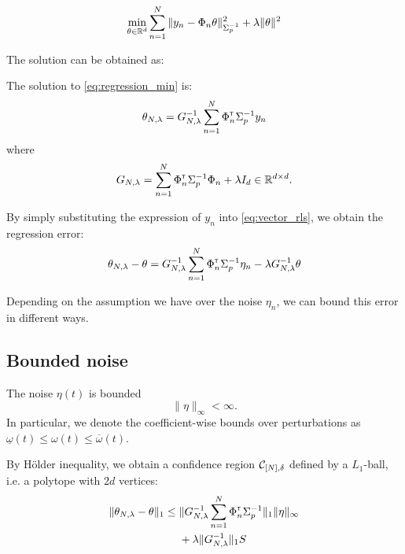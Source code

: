 \documentclass{article}
\begin{document}
\begin{equation}
    \label{eq:regression_min}
    \min_{\theta\in\mathbb{R}^d} \sum_{n=1}^N \|y_n -\Phi_n\theta\|_{\Sigma_p^{-1}}^2 + \lambda\|\theta\|_{}^2
\end{equation}


The solution can be obtained as:

\begin{proposition}
\label{prop:regularized_solution}
The solution to \eqref{eq:regression_min} is:
\begin{equation}
    \label{eq:vector_rls}
    \theta_{N,\lambda} = G_{N, \lambda}^{-1} \sum_{n=1}^N \Phi_n^{\mathsf{\scriptscriptstyle T}} \Sigma_p^{-1} y_n
\end{equation}
where 
\begin{equation}
\label{eq:g_n_lambda}
    G_{N, \lambda} = \sum_{n=1}^N \Phi_{n}^{\mathsf{\scriptscriptstyle T}}\Sigma_p^{-1}\Phi_{n}  + \lambda I_d \in \mathbb{R}^{d\times d}.
\end{equation}
\end{proposition}

By simply substituting the expression of $y_n$ into \eqref{eq:vector_rls}, we obtain the regression error:
\begin{align}
    \theta_{N,\lambda} - \theta = G_{N, \lambda}^{-1}\sum_{n=1}^N \Phi_n^{\mathsf{\scriptscriptstyle T}} \Sigma_p^{-1}\eta_n - \lambda G_{N, \lambda}^{-1}\theta 
\end{align}


Depending on the assumption we have over the noise $\eta_n$, we can bound this error in different ways.


\subsection{Bounded noise}

\begin{assumption}
\label{assumpt:bounded-noise}
The noise $\eta(t)$ is bounded
\[
\|\eta\|_\infty < \infty.
\]
In particular, we denote the coefficient-wise bounds over perturbations as $\underline{\omega}(t) \leq \omega(t) \leq \overline{\omega}(t)$.
\end{assumption}

By Hölder inequality, we obtain a confidence region $\mathcal{C}_{[N],\delta}$ defined by a $L_1$-ball, i.e. a polytope with $2d$ vertices:
\begin{equation}
\begin{split}
\label{eq:bounded-noise-polytope}
\|\theta_{N,\lambda} - \theta\|_1 \leq {} &\|G_{N, \lambda}^{-1}\sum_{n=1}^N \Phi_n^{\mathsf{\scriptscriptstyle T}} \Sigma_p^{-1}\|_1\|\eta\|_\infty \\
&+ \lambda\|G_{N, \lambda}^{-1}\|_1 S
\end{split}
\end{equation}
\end{document}
